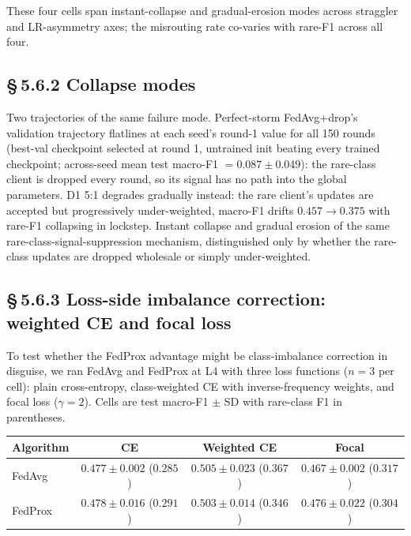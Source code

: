 \documentclass[11pt,a4paper]{report}
\begin{document}
\noindent
These four cells span instant-collapse and gradual-erosion modes across
straggler and LR-asymmetry axes; the misrouting rate co-varies with rare-F1
across all four.


\subsection*{\S\,5.6.2 Collapse modes}

Two trajectories of the same failure mode. Perfect-storm FedAvg+drop's
validation trajectory flatlines at each seed's round-1 value for all 150
rounds (best-val checkpoint selected at round 1, untrained init beating
every trained checkpoint; across-seed mean test macro-F1 $= 0.087 \pm 0.049$):
the rare-class client is dropped every round, so its signal has no path
into the global parameters. D1 5:1 degrades gradually instead: the rare client's updates
are accepted but progressively under-weighted, macro-F1 drifts $0.457 \to
0.375$ with rare-F1 collapsing in lockstep. Instant collapse and gradual
erosion of the same rare-class-signal-suppression mechanism, distinguished
only by whether the rare-class updates are dropped wholesale or simply
under-weighted.


\subsection*{\S\,5.6.3 Loss-side imbalance correction: weighted CE and
focal loss}

To test whether the FedProx advantage might be class-imbalance correction
in disguise, we ran FedAvg and FedProx at L4 with three loss functions
($n=3$ per cell): plain cross-entropy, class-weighted CE with
inverse-frequency weights, and focal loss ($\gamma = 2$). Cells are test
macro-F1 $\pm$ SD with rare-class F1 in parentheses.

\begin{center}
\begin{tabular}{lccc}
\hline
Algorithm & CE & Weighted CE & Focal \\
\hline
FedAvg  & $0.477 \pm 0.002$ ($0.285$) & $\mathbf{0.505 \pm 0.023}$ ($\mathbf{0.367}$) & $0.467 \pm 0.002$ ($0.317$) \\
FedProx & $0.478 \pm 0.016$ ($0.291$) & $0.503 \pm 0.014$ ($0.346$)                   & $0.476 \pm 0.022$ ($0.304$) \\
\hline
\end{tabular}
\end{center}
\end{document}
